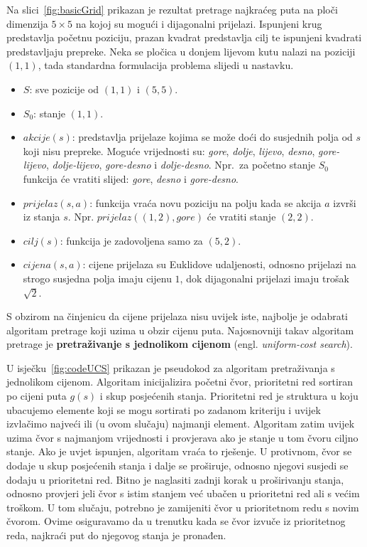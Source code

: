 \documentclass[times, utf8, zavrsni, numeric]{fer}
\begin{document}
Na slici~\ref{fig:basicGrid} prikazan je rezultat pretrage najkraćeg puta na ploči dimenzija \(5\times5\) na kojoj su mogući i dijagonalni prijelazi.
Ispunjeni krug predstavlja početnu poziciju, prazan kvadrat predstavlja cilj te ispunjeni kvadrati predstavljaju prepreke.
Neka se pločica u donjem lijevom kutu nalazi na poziciji \((1, 1)\), tada standardna formulacija problema slijedi u nastavku.
\begin{itemize}
    \item \(S\): sve pozicije od \((1, 1)\) i \((5, 5)\).
    \item \(S_0\): stanje \((1, 1)\).
    \item \(akcije(s)\): predstavlja prijelaze kojima se može doći do susjednih polja od \(s\) koji nisu prepreke. 
    Moguće vrijednosti su: \textit{gore}, \textit{dolje}, \textit{lijevo}, \textit{desno}, \textit{gore-lijevo}, \textit{dolje-lijevo}, \textit{gore-desno} i \textit{dolje-desno}. 
    Npr.\ za početno stanje \(S_0\) funkcija će vratiti slijed: \textit{gore}, \textit{desno} i \textit{gore-desno}. 
    \item \(prijelaz(s, a)\): funkcija vraća novu poziciju na polju kada se akcija \(a\) izvrši iz stanja \(s\). Npr. \(prijelaz((1, 2), gore)\) će vratiti stanje \((2, 2)\).
    \item \(cilj(s)\): funkcija je zadovoljena samo za \((5, 2)\).
    \item \(cijena(s, a)\): cijene prijelaza su Euklidove udaljenosti, odnosno prijelazi na strogo susjedna polja imaju cijenu \(1\), dok dijagonalni prijelazi imaju trošak \(\sqrt{2}\).
\end{itemize}

\par S obzirom na činjenicu da cijene prijelaza nisu uvijek iste, najbolje je odabrati algoritam pretrage koji uzima u obzir cijenu puta.
Najosnovniji takav algoritam pretrage je \textbf{pretraživanje s jednolikom cijenom} (engl. \textit{uniform-cost search}).

\par U isječku~\ref{fig:codeUCS} prikazan je pseudokod za algoritam pretraživanja s jednolikom cijenom. 
Algoritam inicijalizira početni čvor, prioritetni red sortiran po cijeni puta \(g(s)\) i skup posjećenih stanja. 
Prioritetni red je struktura u koju ubacujemo elemente koji se mogu sortirati po zadanom kriteriju i uvijek izvlačimo najveći ili (u ovom slučaju) najmanji element.
Algoritam zatim uvijek uzima čvor s najmanjom vrijednosti i provjerava ako je stanje u tom čvoru ciljno stanje.
Ako je uvjet ispunjen, algoritam vraća to rješenje.
U protivnom, čvor se dodaje u skup posjećenih stanja i dalje se proširuje, odnosno njegovi susjedi se dodaju u prioritetni red.
Bitno je naglasiti zadnji korak u proširivanju stanja, odnosno provjeri jeli čvor s istim stanjem već ubačen u prioritetni red ali s većim troškom.
U tom slučaju, potrebno je zamijeniti čvor u prioritetnom redu s novim čvorom.
Ovime osiguravamo da u trenutku kada se čvor izvuče iz prioritetnog reda, najkraći put do njegovog stanja je pronađen.
\end{document}
